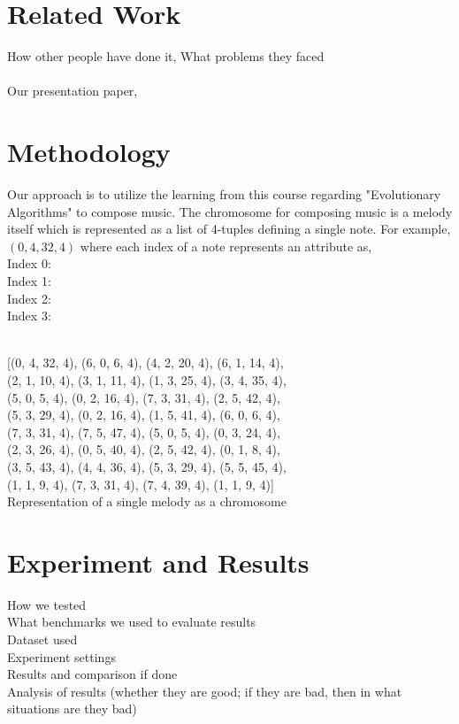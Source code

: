 \documentclass[conference]{IEEEtran}
\begin{document}
\section{Related Work}

How other people have done it, What problems they faced\\\\
Our presentation paper, 

\section{Methodology}
Our approach is to utilize the learning from this course regarding "Evolutionary Algorithms" to compose music. The chromosome for composing music is a melody itself which is represented as a list of 4-tuples defining a single note. For example, $(0, 4, 32, 4)$ where each index of a note represents an attribute as, \\
Index 0:\\
Index 1:\\
Index 2:\\
Index 3:\\\\

\begin{center}
    [(0, 4, 32, 4), (6, 0, 6, 4), (4, 2, 20, 4), (6, 1, 14, 4),\\ (2, 1, 10, 4), (3, 1, 11, 4), (1, 3, 25, 4), (3, 4, 35, 4),\\ (5, 0, 5, 4), (0, 2, 16, 4), (7, 3, 31, 4), (2, 5, 42, 4),\\ (5, 3, 29, 4), (0, 2, 16, 4), (1, 5, 41, 4), (6, 0, 6, 4),\\ (7, 3, 31, 4), (7, 5, 47, 4), (5, 0, 5, 4), (0, 3, 24, 4),\\ (2, 3, 26, 4), (0, 5, 40, 4), (2, 5, 42, 4), (0, 1, 8, 4),\\ (3, 5, 43, 4), (4, 4, 36, 4), (5, 3, 29, 4), (5, 5, 45, 4),\\ (1, 1, 9, 4), (7, 3, 31, 4), (7, 4, 39, 4), (1, 1, 9, 4)]\\
    
    Representation of a single melody as a chromosome
\end{center}














\section{Experiment and Results}
How we tested\\
What benchmarks we used to evaluate results\\
Dataset used\\
Experiment settings\\
Results and comparison if done\\
Analysis of results (whether they are good; if they are bad, then in what situations are they bad)
\end{document}
